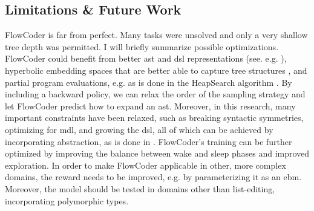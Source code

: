 \subsection{Limitations \& Future Work}
FlowCoder is far from perfect. Many tasks were unsolved and only a very shallow tree depth was permitted. 
I will briefly summarize possible optimizations. 
FlowCoder could benefit from better \acrshort{ast} and \acrshort{dsl} representations (see. e.g. \cite{oliveiraAbstractSyntaxGraphs2013, zhangNovelNeuralSource2019}), hyperbolic embedding spaces that are better able to capture tree structures \cite{luHyperbolicFunctionEmbedding2019}, and partial program evaluations, e.g. as is done in the HeapSearch algorithm \cite{fijalkowScalingNeuralProgram2021}.
By including a backward policy, we can relax the order of the sampling strategy and let FlowCoder predict how to expand an \acrshort{ast}.
Moreover, in this research, many important constraints have been relaxed, such as breaking syntactic symmetries, optimizing for \acrlong{mdl}, and growing the \acrshort{dsl}, all of which can be achieved by incorporating abstraction, as is done in \cite{ellisDreamCoderBootstrappingInductive2021}.
FlowCoder's training can be further optimized by improving the balance between wake and sleep phases and improved exploration.
In order to make FlowCoder applicable in other, more complex domains, the reward needs to be improved, e.g. by parameterizing it as an \acrshort{ebm}. Moreover, the model should be tested in domains other than list-editing, incorporating polymorphic types.


